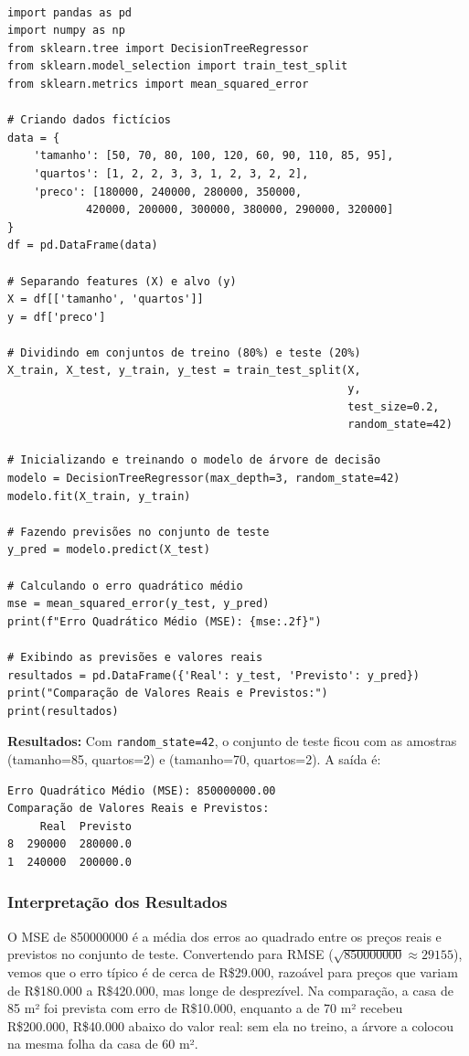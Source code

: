\documentclass[a4paper,12pt,openany]{book}
\begin{document}
\begin{verbatim}
    
import pandas as pd
import numpy as np
from sklearn.tree import DecisionTreeRegressor
from sklearn.model_selection import train_test_split
from sklearn.metrics import mean_squared_error

# Criando dados fictícios
data = {
    'tamanho': [50, 70, 80, 100, 120, 60, 90, 110, 85, 95],
    'quartos': [1, 2, 2, 3, 3, 1, 2, 3, 2, 2],
    'preco': [180000, 240000, 280000, 350000, 
            420000, 200000, 300000, 380000, 290000, 320000]
}
df = pd.DataFrame(data)

# Separando features (X) e alvo (y)
X = df[['tamanho', 'quartos']]
y = df['preco']

# Dividindo em conjuntos de treino (80%) e teste (20%)
X_train, X_test, y_train, y_test = train_test_split(X, 
                                                    y, 
                                                    test_size=0.2, 
                                                    random_state=42)

# Inicializando e treinando o modelo de árvore de decisão
modelo = DecisionTreeRegressor(max_depth=3, random_state=42)
modelo.fit(X_train, y_train)

# Fazendo previsões no conjunto de teste
y_pred = modelo.predict(X_test)

# Calculando o erro quadrático médio
mse = mean_squared_error(y_test, y_pred)
print(f"Erro Quadrático Médio (MSE): {mse:.2f}")

# Exibindo as previsões e valores reais
resultados = pd.DataFrame({'Real': y_test, 'Previsto': y_pred})
print("Comparação de Valores Reais e Previstos:")
print(resultados)
\end{verbatim}
\textbf{Resultados:} Com \texttt{random\_state=42}, o conjunto de teste ficou com as amostras (tamanho=85, quartos=2) e (tamanho=70, quartos=2). A saída é:

\begin{verbatim}
Erro Quadrático Médio (MSE): 850000000.00
Comparação de Valores Reais e Previstos:
     Real  Previsto
8  290000  280000.0
1  240000  200000.0
\end{verbatim}

\subsubsection{Interpretação dos Resultados}
O MSE de 850000000 é a média dos erros ao quadrado entre os preços reais e previstos no conjunto de teste. Convertendo para RMSE ($\sqrt{850000000} \approx 29155$), vemos que o erro típico é de cerca de R\$29.000, razoável para preços que variam de R\$180.000 a R\$420.000, mas longe de desprezível. Na comparação, a casa de 85 m² foi prevista com erro de R\$10.000, enquanto a de 70 m² recebeu R\$200.000, R\$40.000 abaixo do valor real: sem ela no treino, a árvore a colocou na mesma folha da casa de 60 m².
\end{document}
